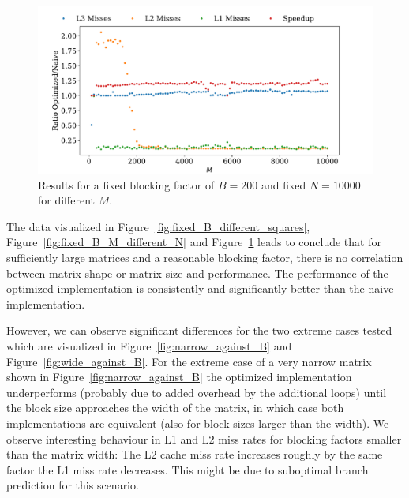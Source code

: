 \documentclass[a4paper, 11pt]{article}
\begin{document}
\begin{figure}
  \centering
  \includegraphics[width=\textwidth]{../plot/fixed_B_N_different_M.pdf}
  \caption{Results for a fixed blocking factor of $B=200$ and fixed $N=10000$
  for different $M$.}
  \label{fig:fixed_B_N_different_M}
\end{figure}

\FloatBarrier
The data visualized in Figure~\ref{fig:fixed_B_different_squares},
Figure~\ref{fig:fixed_B_M_different_N} and
Figure~\ref{fig:fixed_B_N_different_M} leads to conclude that for sufficiently
large matrices and a reasonable blocking factor, there is no correlation
between matrix shape or matrix size and performance. The performance of the
optimized implementation is consistently and significantly better than the
naive implementation.

However, we can observe significant differences for the two extreme cases
tested which are visualized in Figure~\ref{fig:narrow_against_B} and
Figure~\ref{fig:wide_against_B}. For the extreme case of a very narrow matrix
shown in Figure~\ref{fig:narrow_against_B} the optimized implementation
underperforms (probably due to added overhead by the additional loops) until
the block size approaches the width of the matrix, in which case both
implementations are equivalent (also for block sizes larger than the width). We
observe interesting behaviour in L1 and L2 miss rates for blocking factors
smaller than the matrix width: The L2 cache miss rate increases roughly by the
same factor the L1 miss rate decreases. This might be due to suboptimal branch
prediction for this scenario.
\end{document}
